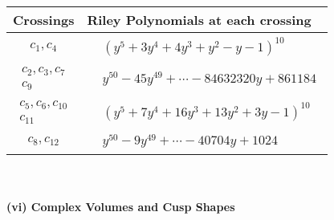 \documentclass[1p]{elsarticle_modified}
\theoremstyle{definition}
\begin{document}
\begin{tabular}{m{50pt}|m{274pt}}
Crossings & \hspace{64pt}Riley Polynomials at each crossing \\
\hline $$\begin{aligned}c_{1},c_{4}\end{aligned}$$&$\begin{aligned}
&(y^5+3 y^4+4 y^3+y^2- y-1)^{10}
\end{aligned}$\\
\hline $$\begin{aligned}c_{2},c_{3},c_{7}\\c_{9}\end{aligned}$$&$\begin{aligned}
&y^{50}-45 y^{49}+\cdots-84632320 y+861184
\end{aligned}$\\
\hline $$\begin{aligned}c_{5},c_{6},c_{10}\\c_{11}\end{aligned}$$&$\begin{aligned}
&(y^5+7 y^4+16 y^3+13 y^2+3 y-1)^{10}
\end{aligned}$\\
\hline $$\begin{aligned}c_{8},c_{12}\end{aligned}$$&$\begin{aligned}
&y^{50}-9 y^{49}+\cdots-40704 y+1024
\end{aligned}$\\
\hline
\end{tabular}\\~\\
\newpage\flushleft \textbf{(vi) Complex Volumes and Cusp Shapes}
\end{document}
